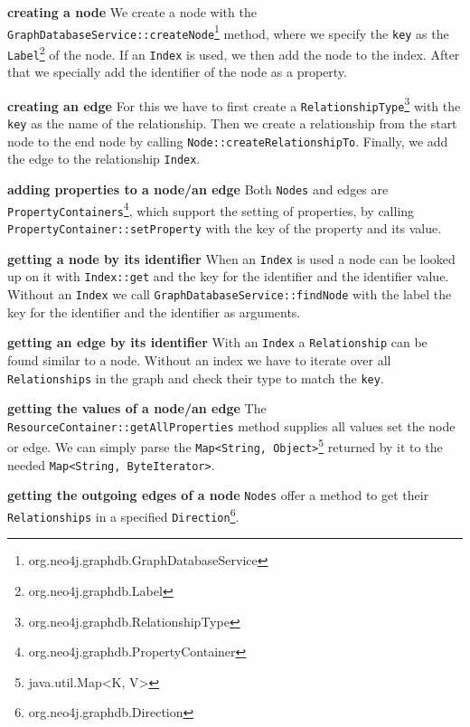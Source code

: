 \textbf{creating a node} \newline
We create a node with the \texttt{GraphDatabaseService::createNode}\footnote{org.neo4j.graphdb.GraphDatabaseService} method,
where we specify the \texttt{key} as the \texttt{Label}\footnote{org.neo4j.graphdb.Label} of the node.
If an \texttt{Index} is used,
we then add the node to the index.
After that we specially add the identifier of the node as a property.

\textbf{creating an edge} \newline
For this we have to first create a \texttt{RelationshipType}\footnote{org.neo4j.graphdb.RelationshipType} with the \texttt{key} as the name of the relationship.
Then we create a relationship from the start node to the end node by calling \texttt{Node::createRelationshipTo}.
Finally,
we add the edge to the relationship \texttt{Index}.

\textbf{adding properties to a node/an edge} \newline
Both \texttt{Nodes} and edges are \texttt{PropertyContainers}\footnote{org.neo4j.graphdb.PropertyContainer},
which support the setting of properties,
by calling \texttt{PropertyContainer::setProperty} with the key of the property and its value.

\textbf{getting a node by its identifier} \newline
When an \texttt{Index} is used a node can be looked up on it with \texttt{Index::get} and the key for the identifier and the identifier value.
Without an \texttt{Index} we call \texttt{GraphDatabaseService::findNode} with the label the key for the identifier and the identifier as arguments.

\textbf{getting an edge by its identifier} \newline
With an \texttt{Index} a \texttt{Relationship} can be found similar to a node.
Without an index we have to iterate over all \texttt{Relationships} in the graph and check their type to match the \texttt{key}.

\textbf{getting the values of a node/an edge} \newline
The \texttt{ResourceContainer::getAllProperties} method supplies all values set the node or edge.
We can simply parse the \texttt{Map<String, Object>}\footnote{java.util.Map<K, V>} returned by it to the needed \texttt{Map<String, ByteIterator>}.

\textbf{getting the outgoing edges of a node} \newline
\texttt{Nodes} offer a method to get their \texttt{Relationships} in a specified \texttt{Direction}\footnote{org.neo4j.graphdb.Direction}.

